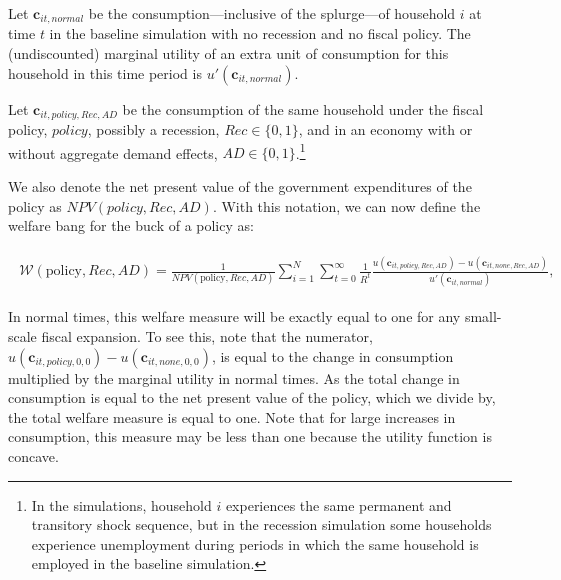 \documentclass[\econtexRoot/HAFiscal]{subfiles}
\begin{document}
Let $\mathbf{c}_{it,\textit{normal}}$ be the consumption---inclusive of the splurge---of household $i$ at time $t$ in the baseline simulation with no recession and no fiscal policy.
The (undiscounted) marginal utility of an extra unit of consumption for this household in this time period is $ u'(\mathbf{c}_{it,\textit{normal}})$.


Let $\mathbf{c}_{it,\textit{policy},Rec,AD}$ be the consumption of the same household under the fiscal policy, $\textit{policy}$, possibly a recession, $Rec \in \{0,1\}$, and in an economy with or without aggregate demand effects, $AD \in \{0,1\}$.\footnote{In the simulations, household $i$ experiences the same permanent and transitory shock sequence, but in the recession simulation some households experience unemployment during periods in which the same household is employed in the baseline simulation.}

We also denote the net present value of the government expenditures of the policy as $NPV(\textit{policy},Rec,AD)$.
With this notation, we can now define the welfare bang for the buck of a policy as:

\begin{equation}\begin{gathered}\begin{aligned} \label{welfare_def6}
	\mathcal{W}(\text{policy},Rec,AD) =\frac{1}{NPV(\text{policy},Rec,AD)}\sum_{i=1}^{N} \sum_{t=0}^{\infty} \frac{1}{R^t} \frac{u(\mathbf{c}_{it,\textit{policy},Rec,AD}) - u(\mathbf{c}_{it,\textit{none},Rec,AD})}{ u'(\mathbf{c}_{it,\textit{normal}})} ,
\end{aligned}\end{gathered}\end{equation}

In normal times, this welfare measure will be exactly equal to one for any small-scale fiscal expansion.
To see this, note that the numerator,  $u(\mathbf{c}_{it,\textit{policy},0,0}) - u(\mathbf{c}_{it,\textit{none},0,0})$, is equal to the change in consumption multiplied by the marginal utility in normal times.
As the total change in consumption is equal to the net present value of the policy, which we divide by, the total welfare measure is equal to one.
Note that for large increases in consumption, this measure may be less than one because the utility function is concave.
\end{document}
